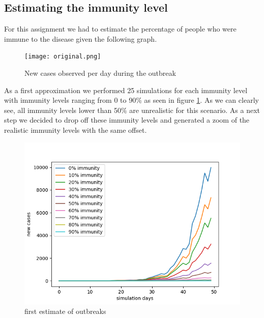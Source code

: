 \documentclass[runningheads]{llncs}
\begin{document}
	\subsection{Estimating the immunity level}
	For this assignment we had to estimate the percentage of people who were immune to the disease given the following graph.
	\\ 
	\begin{figure}[h!]
		\texttt{[image: original.png]}
		\caption{New cases observed per day during the outbreak}
	\end{figure}
	\newpage
	As a first approximation we performed 25 simulations for each immunity level with immunity levels ranging from 0 to 90\% as seen in figure \ref{fig5}. As we can clearly see, all immunity levels lower than 50\% are unrealistic for this scenario. As a next step we decided to drop off these immunity levels and generated a zoom of the realistic immunity levels with the same offset.
	\begin{figure}
		\includegraphics[width=\textwidth]{test_immunity_0-100.png}
		\caption{first estimate of outbreaks}
		\label{fig5}
	\end{figure}
	\newpage
	
\end{document}
